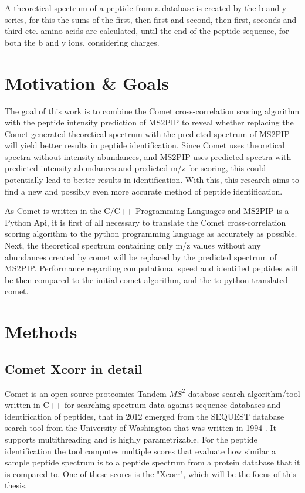 \documentclass[11pt]{article}
\begin{document}
A theoretical spectrum of a peptide from a database is created by the b and y series, for this the sums of the first, then first and second, then first, seconds and third etc. amino acids are calculated, until the end of the peptide sequence, for both the b and y ions, considering charges.

\newpage
% 
\section{Motivation \& Goals}
The goal of this work is to combine the Comet cross-correlation scoring algorithm
with the peptide intensity prediction of MS2PIP to reveal whether replacing the Comet generated theoretical spectrum with the predicted spectrum of MS2PIP will yield better results in peptide identification. Since Comet uses theoretical spectra without intensity abundances, and MS2PIP uses predicted spectra with predicted intensity abundances and predicted m/z for scoring, this could potentially lead to better results in identification. With this, this research aims to find a new and possibly even more accurate method of peptide identification.

As Comet is written in the C/C++ Programming Languages and MS2PIP is a Python Api, it is first of all necessary to translate the Comet cross-correlation scoring algorithm to the python programming language as accurately as possible. Next, the theoretical spectrum containing only m/z values without any abundances created by comet will be replaced by the predicted spectrum of MS2PIP. Performance regarding computational speed and identified peptides will be then compared to the initial comet algorithm, and the to python translated comet. 

\newpage

\section{Methods}
\subsection{Comet Xcorr in detail}
Comet is an open source proteomics Tandem \(MS^2\) database search algorithm/tool written in C++ for searching spectrum data against sequence databases and identification of peptides, that in 2012 emerged from the SEQUEST database search tool from the University of Washington that was written in 1994 \cite{comet-search-tool}. It supports multithreading and is highly parametrizable. For the peptide identification the tool computes multiple scores that evaluate how similar a sample peptide spectrum is to a peptide spectrum from a protein database that it is compared to. One of these scores is the "Xcorr", which will be the focus of this thesis. 
\end{document}
